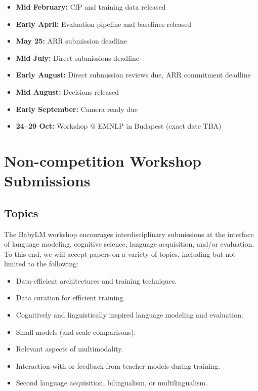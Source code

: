 \documentclass[11pt]{article}
\begin{document}
\begin{itemize}[leftmargin=0.5cm,rightmargin=0.5cm,itemsep=0em]
    \item \textbf{Mid February:} CfP and training data released
    \item \textbf{Early April:} Evaluation pipeline and baselines released
    \item \textbf{May 25:} ARR submission deadline
    \item \textbf{Mid July:} Direct submissions deadline
    \item \textbf{Early August:} Direct submission reviews due, ARR commitment deadline
    \item \textbf{Mid August:} Decisions released
    \item \textbf{Early September:} Camera ready due
    \item \textbf{24--29 Oct:} Workshop @ EMNLP in Budapest (exact date TBA)
\end{itemize}


\section{Non-competition Workshop Submissions} %
\subsection{Topics} \label{sec:topics}
The BabyLM workshop encourages interdisciplinary submissions at the interface of language modeling, cognitive science, language acquisition, and/or evaluation. To this end, we will accept papers on a variety of topics, including but not limited to the following:
\begin{itemize}[noitemsep]
    \item Data-efficient architectures and training techniques.
    \item Data curation for efficient training.
    \item Cognitively and linguistically inspired language modeling and evaluation.
    \item Small models (and scale comparisons).
    \item Relevant aspects of multimodality.
    \item Interaction with or feedback from teacher models during training.
    \item Second language acquisition, bilingualism, or multilingualism.
\end{itemize}
\end{document}
